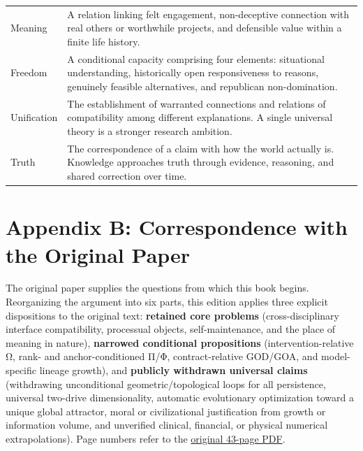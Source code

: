 \documentclass[
  english,
  11pt,
  oneside]{book}
\begin{document}
{\begin{longtable}[]{@{}
  >{\raggedright\arraybackslash}p{}
  >{\raggedright\arraybackslash}p{}@{}}
Meaning & A relation linking felt engagement, non-deceptive connection with real others or worthwhile projects, and defensible value within a finite life history. \\
Freedom & A conditional capacity comprising four elements: situational understanding, historically open responsiveness to reasons, genuinely feasible alternatives, and republican non-domination. \\
Unification & The establishment of warranted connections and relations of compatibility among different explanations. A single universal theory is a stronger research ambition. \\
Truth & The correspondence of a claim with how the world actually is. Knowledge approaches truth through evidence, reasoning, and shared correction over time. \\
\end{longtable}
}

\chapter{Appendix B: Correspondence with the Original Paper}\label{ph-app-b}

The original paper supplies the questions from which this book begins. Reorganizing the argument into six parts, this edition applies three explicit dispositions to the original text: \textbf{retained core problems} (cross-disciplinary interface compatibility, processual objects, self-maintenance, and the place of meaning in nature), \textbf{narrowed conditional propositions} (intervention-relative Ω, rank- and anchor-conditioned Π/Φ, contract-relative GOD/GOA, and model-specific lineage growth), and \textbf{publicly withdrawn universal claims} (withdrawing unconditional geometric/topological loops for all persistence, universal two-drive dimensionality, automatic evolutionary optimization toward a unique global attractor, moral or civilizational justification from growth or information volume, and unverified clinical, financial, or physical numerical extrapolations). Page numbers refer to the \href{https://github.com/MurphyHoops/UEOT/blob/3d443ec29eb17af1fc00699a74e2d42d73516d81/UEOT_v3_top.pdf}{original 43-page PDF}.
\end{document}

